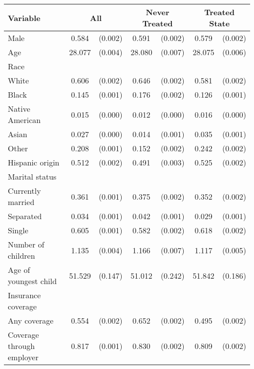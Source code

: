 \begin{tabular}{lcccccc}
\toprule
\toprule
 Variable & \multicolumn{2}{c}{All} & \multicolumn{2}{c}{Never Treated} & \multicolumn{2}{c}{Treated State} \\
\midrule 
 Male   & 0.584 & (0.002)  & 0.591 & (0.002)  & 0.579 & (0.002)  \\
 Age   & 28.077 & (0.004)  & 28.080 & (0.007)  & 28.075 & (0.006)  \\
 Race   & & &  \\
 \hspace{0.3cm}  White   & 0.606 & (0.002)  & 0.646 & (0.002)  & 0.581 & (0.002)  \\
 \hspace{0.3cm}  Black   & 0.145 & (0.001)  & 0.176 & (0.002)  & 0.126 & (0.001)  \\
 \hspace{0.3cm}  Native American   & 0.015 & (0.000)  & 0.012 & (0.000)  & 0.016 & (0.000)  \\
 \hspace{0.3cm}  Asian   & 0.027 & (0.000)  & 0.014 & (0.001)  & 0.035 & (0.001)  \\
 \hspace{0.3cm}  Other   & 0.208 & (0.001)  & 0.152 & (0.002)  & 0.242 & (0.002)  \\
 Hispanic origin   & 0.512 & (0.002)  & 0.491 & (0.003)  & 0.525 & (0.002)  \\
 Marital status   & & &  \\
 \hspace{0.3cm} Currently married   & 0.361 & (0.001)  & 0.375 & (0.002)  & 0.352 & (0.002)  \\
 \hspace{0.3cm} Separated   & 0.034 & (0.001)  & 0.042 & (0.001)  & 0.029 & (0.001)  \\
 \hspace{0.3cm} Single   & 0.605 & (0.001)  & 0.582 & (0.002)  & 0.618 & (0.002)  \\
 Number of children   & 1.135 & (0.004)  & 1.166 & (0.007)  & 1.117 & (0.005)  \\
 Age of youngest child   & 51.529 & (0.147)  & 51.012 & (0.242)  & 51.842 & (0.186)  \\
 Insurance coverage   & & &  \\
 \hspace{0.3cm}  Any coverage   & 0.554 & (0.002)  & 0.652 & (0.002)  & 0.495 & (0.002)  \\
 \hspace{0.3cm}  Coverage through employer   & 0.817 & (0.001)  & 0.830 & (0.002)  & 0.809 & (0.002)  \\

\end{tabular}
